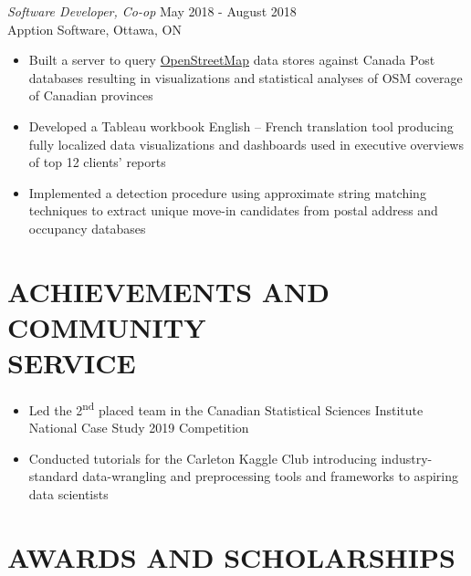 \documentclass[margin]{res}
\newcommand{\ts}{\textsuperscript}
\begin{document}
\begin{resume}
{\sl Software Developer, Co-op} \hfill            May 2018 - August 2018\\
Apption Software, Ottawa, ON 
\begin{itemize}  \itemsep -2pt %
\item Built a server to query \href{https://www.openstreetmap.org/}{OpenStreetMap} data stores
      against Canada Post databases resulting in visualizations and statistical analyses of OSM
      coverage of Canadian provinces
\item Developed a Tableau workbook English – French translation tool producing fully
      localized data visualizations and dashboards used in executive overviews of top 12
      clients’ reports 
\item Implemented a detection procedure using approximate string matching techniques to extract
      unique move-in candidates from postal address and occupancy databases 
\end{itemize}


\section{ACHIEVEMENTS AND \\COMMUNITY \\ SERVICE }
\begin{itemize} \itemsep -2pt
\item{Led the 2\ts{nd} placed team in the Canadian Statistical Sciences Institute National Case Study 2019 Competition}
\item{
      Conducted tutorials for the Carleton Kaggle Club introducing industry-standard data-wrangling and preprocessing tools and frameworks to aspiring data scientists 
      }
      
\end{itemize}


\section{AWARDS AND SCHOLARSHIPS}


\end{resume}
\end{document}
